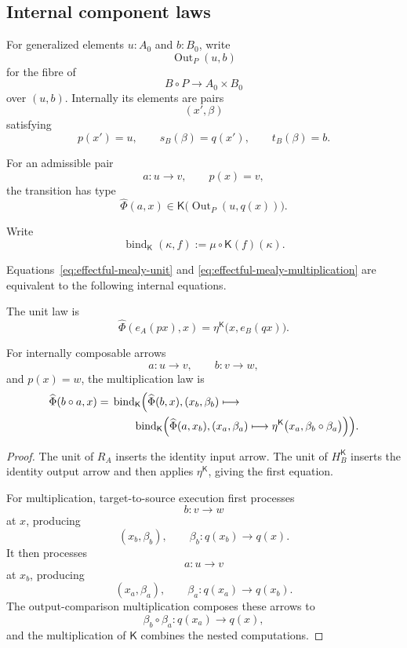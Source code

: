 \subsection{Internal component laws}
\label{subsec:internal-effectful-mealy-laws}

For generalized elements \(u:A_0\) and \(b:B_0\), write
\[
    \operatorname{Out}_P(u,b)
\]
for the fibre of
\[
    B\circ P\longrightarrow A_0\times B_0
\]
over \((u,b)\).  Internally its elements are pairs
\[
    (x',\beta)
\]
satisfying
\[
    p(x')=u,
    \qquad
    s_B(\beta)=q(x'),
    \qquad
    t_B(\beta)=b.
\]

For an admissible pair
\[
    a:u\to v,
    \qquad
    p(x)=v,
\]
the transition has type
\[
    \widehat\Phi(a,x)
    \in
    \mathsf K
    \bigl(
        \operatorname{Out}_P(u,q(x))
    \bigr).
\]

Write
\[
    \operatorname{bind}_{\mathsf K}(\kappa,f)
    :=
    \mu\circ\mathsf K(f)(\kappa).
\]

\begin{proposition}
\label{prop:effectful-mealy-component-laws}
Equations~\eqref{eq:effectful-mealy-unit} and
\eqref{eq:effectful-mealy-multiplication} are equivalent to the following
internal equations.

The unit law is
\[
    \widehat\Phi(e_A(px),x)
    =
    \eta^{\mathsf K}
    \bigl(
        x,e_B(qx)
    \bigr).
\]

For internally composable arrows
\[
    a:u\to v,
    \qquad
    b:v\to w,
\]
and \(p(x)=w\), the multiplication law is
\[
\begin{aligned}
    \widehat\Phi(b\circ a,x)
    ={}&
    \operatorname{bind}_{\mathsf K}
    \Bigl(
        \widehat\Phi(b,x),
        (x_b,\beta_b)
        \longmapsto
    \\
    &\qquad
        \operatorname{bind}_{\mathsf K}
        \Bigl(
            \widehat\Phi(a,x_b),
            (x_a,\beta_a)
            \longmapsto
            \eta^{\mathsf K}
            \bigl(
                x_a,
                \beta_b\circ\beta_a
            \bigr)
        \Bigr)
    \Bigr).
\end{aligned}
\]
\end{proposition}

\begin{proof}
The unit of \(R_A\) inserts the identity input arrow.  The unit of
\(H_B^{\mathsf K}\) inserts the identity output arrow and then applies
\(\eta^{\mathsf K}\), giving the first equation.

For multiplication, target-to-source execution first processes
\[
    b:v\to w
\]
at \(x\), producing
\[
    (x_b,\beta_b),
    \qquad
    \beta_b:q(x_b)\to q(x).
\]
It then processes
\[
    a:u\to v
\]
at \(x_b\), producing
\[
    (x_a,\beta_a),
    \qquad
    \beta_a:q(x_a)\to q(x_b).
\]
The output-comparison multiplication composes these arrows to
\[
    \beta_b\circ\beta_a:
    q(x_a)\to q(x),
\]
and the multiplication of \(\mathsf K\) combines the nested computations.
\end{proof}


